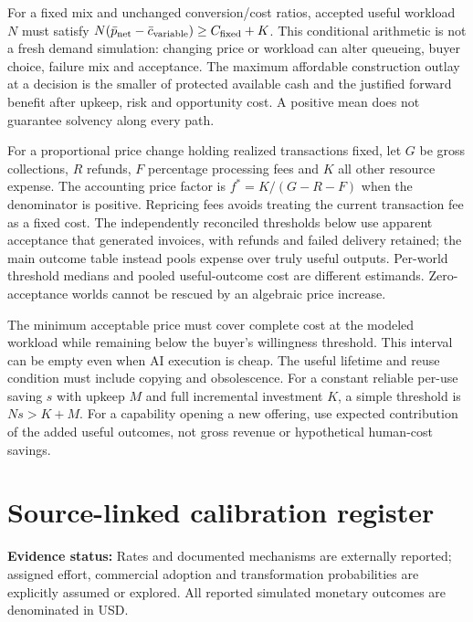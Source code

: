 \documentclass[11pt,a4paper]{article}
\newcommand{\evidence}[1]{{\small\color{muted}\textbf{Evidence status:} #1}\par}
\begin{document}
For a fixed mix and unchanged conversion/cost ratios, accepted useful workload $N$ must satisfy $N(\bar p_{\rm net}-\bar c_{\rm variable})\geq C_{\rm fixed}+K$. This conditional arithmetic is not a fresh demand simulation: changing price or workload can alter queueing, buyer choice, failure mix and acceptance. The maximum affordable construction outlay at a decision is the smaller of protected available cash and the justified forward benefit after upkeep, risk and opportunity cost. A positive mean does not guarantee solvency along every path.

For a proportional price change holding realized transactions fixed, let $G$ be gross collections, $R$ refunds, $F$ percentage processing fees and $K$ all other resource expense. The accounting price factor is $f^*=K/(G-R-F)$ when the denominator is positive. Repricing fees avoids treating the current transaction fee as a fixed cost. The independently reconciled thresholds below use apparent acceptance that generated invoices, with refunds and failed delivery retained; the main outcome table instead pools expense over truly useful outputs. Per-world threshold medians and pooled useful-outcome cost are different estimands. Zero-acceptance worlds cannot be rescued by an algebraic price increase.

The minimum acceptable price must cover complete cost at the modeled workload while remaining below the buyer's willingness threshold. This interval can be empty even when AI execution is cheap. The useful lifetime and reuse condition must include copying and obsolescence. For a constant reliable per-use saving $s$ with upkeep $M$ and full incremental investment $K$, a simple threshold is $Ns>K+M$. For a capability opening a new offering, use expected contribution of the added useful outcomes, not gross revenue or hypothetical human-cost savings.



\section{Source-linked calibration register}
\evidence{Rates and documented mechanisms are externally reported; assigned effort, commercial adoption and transformation probabilities are explicitly assumed or explored. All reported simulated monetary outcomes are denominated in USD.}


\end{document}
